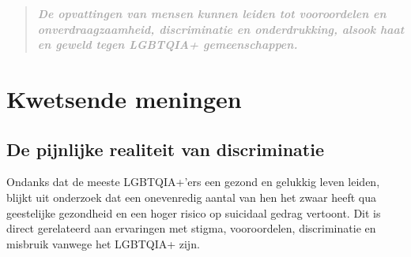 \documentclass[12pt,openany]{book}
\begin{document}
\begin{figure}[h]
    \centering
\end{figure}

\begin{quote}
\centering
\doublespacing
\textit{\Large \textbf{\textcolor{darkgray}{De opvattingen van mensen kunnen leiden tot vooroordelen en onverdraagzaamheid, discriminatie en onderdrukking, alsook haat en geweld tegen LGBTQIA+ gemeenschappen.}}}
\end{quote}

\chapter*{Kwetsende meningen}

\section*{De pijnlijke realiteit van discriminatie}

Ondanks dat de meeste LGBTQIA+'ers een gezond en gelukkig leven leiden, blijkt uit onderzoek dat een onevenredig aantal van hen het zwaar heeft qua geestelijke gezondheid en een hoger risico op suicidaal gedrag vertoont. Dit is direct gerelateerd aan ervaringen met stigma, vooroordelen, discriminatie en misbruik vanwege het LGBTQIA+ zijn. 
\end{document}
